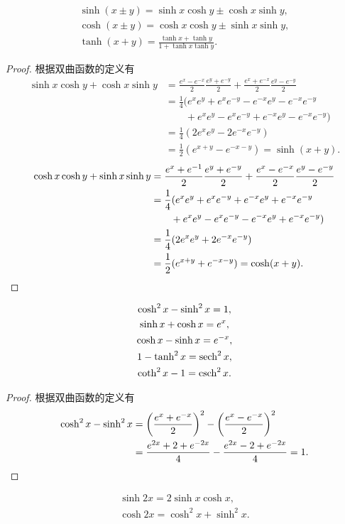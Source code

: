 \begin{theorem}
\begin{gather}
	\sinh(x \pm y) = \sinh x\cosh y \pm \cosh x\sinh y, \\
	\cosh(x \pm y) = \cosh x\cosh y \pm \sinh x\sinh y, \\
	\tanh(x + y) = \frac{\tanh x + \tanh y}{1 + \tanh x\tanh y}.
\end{gather}
\begin{proof}
根据双曲函数的定义有
\begin{align*}
	\sinh x\cosh y+\cosh x\sinh y
	&= \frac{e^x - e^{-x}}{2} \frac{e^y + e^{-y}}{2}
		+ \frac{e^x + e^{-x}}{2} \frac{e^y - e^{-y}}{2} \\
	&= \frac{1}{4} (e^x e^y + e^x e^{-y} - e^{-x} e^y - e^{-x} e^{-y} \\
	&\qquad+ e^x e^y - e^x e^{-y} + e^{-x} e^y - e^{-x} e^{-y}) \\
	&= \frac{1}{4} (2 e^x e^y - 2 e^{-x} e^{-y}) \\
	&= \frac12 (e^{x+y} - e^{-x-y}) = \sinh(x+y).
\end{align*}
\begin{align*}
	\cosh x\cosh y+\sinh x\sinh y
	&= \frac{e^x + e^{-1}}{2} \frac{e^y + e^{-y}}{2}
		+ \frac{e^x - e^{-x}}{2} \frac{e^y - e^{-y}}{2} \\
	&= \frac{1}{4} (e^x e^y + e^x e^{-y} + e^{-x} e^y + e^{-x} e^{-y} \\
	&\qquad+ e^x e^y - e^x e^{-y} - e^{-x} e^y + e^{-x} e^{-y}) \\
	&= \frac{1}{4} (2 e^x e^y + 2 e^{-x} e^{-y}) \\
	&= \frac12 (e^{x+y} + e^{-x-y}) = \cosh(x+y).
	\qedhere
\end{align*}
\end{proof}
\end{theorem}

\begin{theorem}
\begin{gather}
	\cosh^2x - \sinh^2x = 1, \\
	\sinh x + \cosh x = e^x, \\
	\cosh x - \sinh x = e^{-x}, \\
	1 - \tanh^2 x = \sech^2 x, \\
	\coth^2 x - 1 = \csch^2 x.
\end{gather}
\begin{proof}
根据双曲函数的定义有
\begin{align*}
	\cosh^2x-\sinh^2x
	&=\left(\frac{e^x + e^{-x}}{2}\right)^2-\left(\frac{e^x - e^{-x}}{2}\right)^2 \\
	&=\frac{e^{2x}+2+e^{-2x}}{4}-\frac{e^{2x}-2+e^{-2x}}{4}
	=1.
	\qedhere
\end{align*}
\end{proof}
\end{theorem}

\begin{theorem}
\begin{gather}
	\sinh2x = 2 \sinh x\cosh x, \\
	\cosh2x = \cosh^2x + \sinh^2x.
\end{gather}
\end{theorem}
